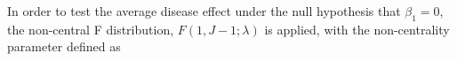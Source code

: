 In order to test the average disease effect under the null hypothesis that $\beta_{1} = 0$, the non-central F distribution,  $F(1,J-1; \lambda)$\cite{Raudenbush2000} is applied, with the non-centrality parameter defined as